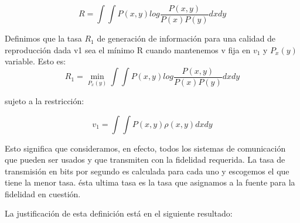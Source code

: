 \begin{equation} R = \int \int P(x,y) log \frac{P(x,y)}{P(x)P(y)}dx dy \end{equation}
			
Definimos que la tasa $R_{1}$ de generaci\'on de informaci\'on para una calidad de reproducci\'on
dada v1 sea el m\'inimo R cuando mantenemos v fija en $v_{1}$ y $P_{x}(y)$ variable. Esto es:
\begin{equation} R_{1} = \min_{P_{x}(y)} \int \int P(x,y) log \frac{P(x,y)}{P(x)P(y)} dx dy \end{equation}

sujeto a la restricci\'on:
	
\begin{equation} v_{1} = \int \int P(x,y) \rho(x,y) dx dy \end{equation}
			
Esto significa que consideramos, en efecto, todos los sistemas de comunicaci\'on que
pueden ser usados y que transmiten con la fidelidad requerida. La tasa de transmisi\'on
en bits por segundo es calculada para cada uno y escogemos el que tiene la menor tasa.
\'esta ultima tasa es la tasa que asignamos a la fuente para la fidelidad en cuesti\'on.

La justificaci\'on de esta definici\'on est\'a en el siguiente resultado:

\newtheorem{Teorema 21}{Teorema 21: Si una fuente tiene una tasa $R_{1}$ para una valuaci\'on $v_{1}$, 
es posible codificar la salida de la fuente y transmitirla sobre un canal de capacidad $C$ con 
fidelidad tan cercana a $v_{1}$ como se desee, siempre que $R_{1}$ \leq $C$. Esto no es posible 
si $R_{1} > C$ .}
 
